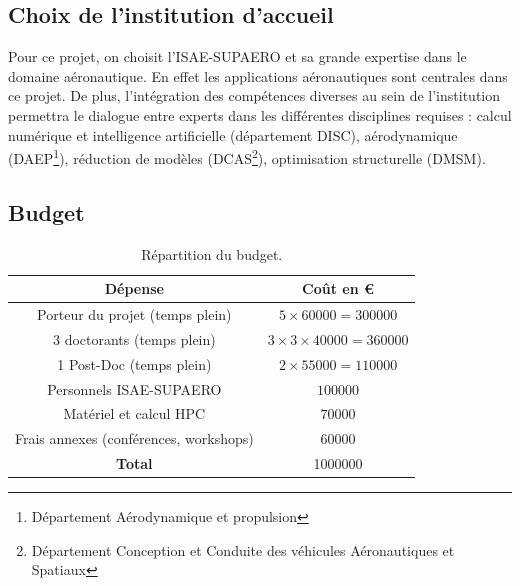 \documentclass[12pt, french]{article}
\begin{document}
\newpage

	
\subsection{Choix de l'institution d'accueil}
Pour ce projet, on choisit l'ISAE-SUPAERO et sa grande expertise dans le domaine aéronautique. En effet les applications aéronautiques sont centrales dans ce projet. De plus, l'intégration des compétences diverses au sein de l'institution permettra le dialogue entre experts dans les différentes disciplines requises : calcul numérique et intelligence artificielle (département DISC), aérodynamique (DAEP\footnote{Département Aérodynamique et propulsion}), réduction de modèles (DCAS\footnote{Département Conception et Conduite des véhicules Aéronautiques et Spatiaux}), optimisation structurelle (DMSM).
	
	
\subsection{Budget}

\begin{table}[h]
\centering
\begin{tabular}{|c|c|}
	\hline
	D\'epense & Co\^{u}t en \euro \\
	\hline
	Porteur du projet (temps plein) & $5\times 60000=300000$ \\
	3 doctorants (temps plein) & $3\times 3\times 40000=360000$  \\
	1 Post-Doc (temps plein) & $2\times 55000=110000$ \\
	Personnels ISAE-SUPAERO & $100000$ \\
	Matériel  et calcul HPC & $70000$ \\
	Frais annexes (conférences, workshops) & $60000$ \\
	\hline
	\textbf{Total} & 1000000 \\
	\hline
\end{tabular}
\caption{Répartition du budget.}
\end{table}
\end{document}
